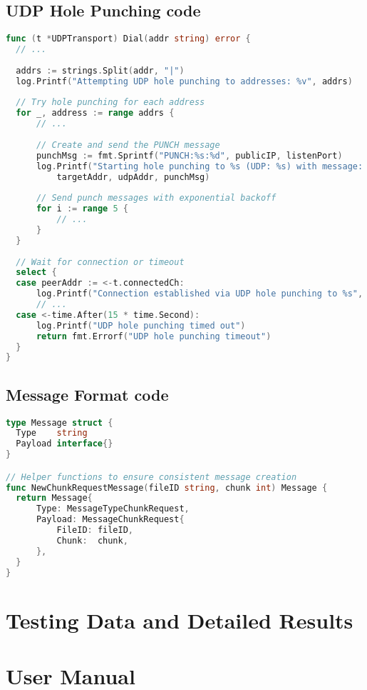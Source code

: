 \documentclass[12pt,a4paper]{report}
\begin{document}
\section{UDP Hole Punching code}
\begin{lstlisting}[language=Go, caption={UDP Hole Punch Implementation}, label={lst:udp-holepunch}]
func (t *UDPTransport) Dial(addr string) error {
  // ...
  
  addrs := strings.Split(addr, "|")
  log.Printf("Attempting UDP hole punching to addresses: %v", addrs)
  
  // Try hole punching for each address
  for _, address := range addrs {
      // ...
      
      // Create and send the PUNCH message
      punchMsg := fmt.Sprintf("PUNCH:%s:%d", publicIP, listenPort)
      log.Printf("Starting hole punching to %s (UDP: %s) with message: %s",
          targetAddr, udpAddr, punchMsg)
      
      // Send punch messages with exponential backoff
      for i := range 5 {
          // ...
      }
  }
  
  // Wait for connection or timeout
  select {
  case peerAddr := <-t.connectedCh:
      log.Printf("Connection established via UDP hole punching to %s", peerAddr)
      // ...
  case <-time.After(15 * time.Second):
      log.Printf("UDP hole punching timed out")
      return fmt.Errorf("UDP hole punching timeout")
  }
}
\end{lstlisting}

\section{Message Format code}
\begin{lstlisting}[language=Go, caption={Message Format}, label={lst:message-format}]
type Message struct {
  Type    string
  Payload interface{}
}

// Helper functions to ensure consistent message creation
func NewChunkRequestMessage(fileID string, chunk int) Message {
  return Message{
      Type: MessageTypeChunkRequest,
      Payload: MessageChunkRequest{
          FileID: fileID,
          Chunk:  chunk,
      },
  }
}
\end{lstlisting}


\chapter{Testing Data and Detailed Results}

\chapter{User Manual}

\renewcommand\bibname{References}
\begin{raggedright} %
	
	
\end{raggedright}
\end{document}
